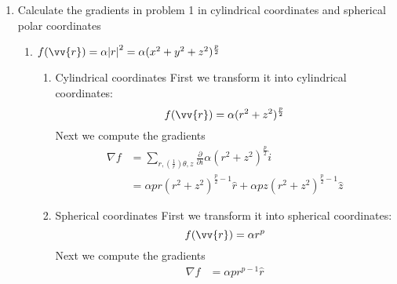\documentclass{article}
\begin{document}
\begin{enumerate}
    \item Calculate the gradients in problem 1 in cylindrical coordinates and spherical polar coordinates
    \begin{enumerate}
        \item $f(\vv{r}) = \alpha\abs{r}^2 = \alpha(x^2+y^2+z^2)^{\frac{p}{2}}$
        \begin{enumerate}
            \item Cylindrical coordinates
            First we transform it into cylindrical coordinates:
            \[
            f(\vv{r}) = \alpha(r^2+z^2)^{\frac{p}{2}}
            \]
            Next we compute the gradients
            \begin{align*}
            \nabla f &= \sum_{r, (\frac{1}{r})\theta, z} \frac{\partial}{\partial i} \alpha(r^2+z^2)^{\frac{p}{2}} \hat{i}\\
            &= \alpha p r(r^2 + z^2)^{\frac{p}{2}-1}\hat{r} + \alpha p z(r^2 + z^2)^{\frac{p}{2}-1}\hat{z}
            \end{align*}
            \item Spherical coordinates 
            First we transform it into spherical coordinates:
            \[
            f(\vv{r}) = \alpha r^p
            \]
            Next we compute the gradients
            \begin{align*}
            \nabla f &= \alpha p r^{p-1} \hat{r}
            \end{align*}
        \end{enumerate}


\end{enumerate}
\end{enumerate}
\end{document}
